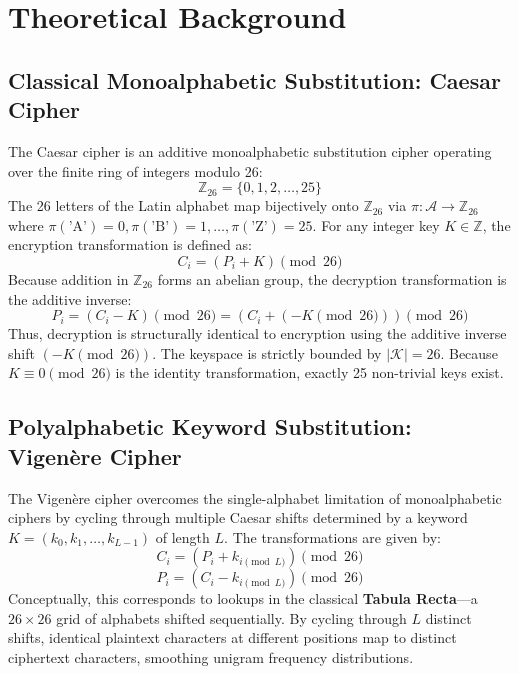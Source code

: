 \documentclass[12pt,a4paper]{report}
\begin{document}
\newpage

\chapter{Theoretical Background}

\section{Classical Monoalphabetic Substitution: Caesar Cipher}
The Caesar cipher is an additive monoalphabetic substitution cipher operating over the finite ring of integers modulo 26:
\begin{equation}
    \mathbb{Z}_{26} = \{0, 1, 2, \dots, 25\}
\end{equation}
The 26 letters of the Latin alphabet map bijectively onto $\mathbb{Z}_{26}$ via $\pi: \mathcal{A} \to \mathbb{Z}_{26}$ where $\pi(\text{'A'}) = 0, \pi(\text{'B'}) = 1, \dots, \pi(\text{'Z'}) = 25$. For any integer key $K \in \mathbb{Z}$, the encryption transformation is defined as:
\begin{equation}
    C_i = (P_i + K) \pmod{26}
\end{equation}
Because addition in $\mathbb{Z}_{26}$ forms an abelian group, the decryption transformation is the additive inverse:
\begin{equation}
    P_i = (C_i - K) \pmod{26} = (C_i + (-K \pmod{26})) \pmod{26}
\end{equation}
Thus, decryption is structurally identical to encryption using the additive inverse shift $(-K \pmod{26})$. The keyspace is strictly bounded by $|\mathcal{K}| = 26$. Because $K \equiv 0 \pmod{26}$ is the identity transformation, exactly 25 non-trivial keys exist.

\section{Polyalphabetic Keyword Substitution: Vigen\`ere Cipher}
The Vigen\`ere cipher overcomes the single-alphabet limitation of monoalphabetic ciphers by cycling through multiple Caesar shifts determined by a keyword $K = (k_0, k_1, \dots, k_{L-1})$ of length $L$. The transformations are given by:
\begin{equation}
    C_i = (P_i + k_{i \pmod L}) \pmod{26}
\end{equation}
\begin{equation}
    P_i = (C_i - k_{i \pmod L}) \pmod{26}
\end{equation}
Conceptually, this corresponds to lookups in the classical \textbf{Tabula Recta}—a $26 \times 26$ grid of alphabets shifted sequentially. By cycling through $L$ distinct shifts, identical plaintext characters at different positions map to distinct ciphertext characters, smoothing unigram frequency distributions.
\end{document}
